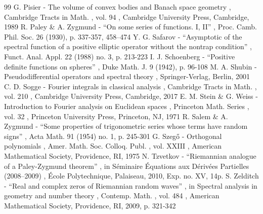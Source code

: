 \documentclass[11pt]{article}
\theoremstyle{theorem}
\theoremstyle{definition}
\begin{document}
\begin{thebibliography}{99}
 G. Pisier - The volume of convex bodies and Banach space geometry , Cambridge Tracts in Math. , vol. 94 , Cambridge University Press, Cambridge, 1989
 R. Paley \& A. Zygmund - “On some series of functions. I, II” , Proc. Camb. Phil. Soc. 26 (1930), p. 337-357, 458–474
 Y. G. Safarov - “Asymptotic of the spectral function of a positive elliptic operator without the nontrap condition” , Funct. Anal. Appl. 22 (1988) no. 3, p. 213-223
 I. J. Schoenberg - “Positive definite functions on spheres” , Duke Math. J. 9 (1942), p. 96-108
 M. A. Shubin - Pseudodifferential operators and spectral theory , Springer-Verlag, Berlin, 2001
 C. D. Sogge - Fourier integrals in classical analysis , Cambridge Tracts in Math. , vol. 210 , Cambridge University Press, Cambridge, 2017
 E. M. Stein \& G. Weiss - Introduction to Fourier analysis on Euclidean spaces , Princeton Math. Series , vol. 32 , Princeton University Press, Princeton, NJ, 1971
 R. Salem \& A. Zygmund - “Some properties of trigonometric series whose terms have random signs” , Acta Math. 91 (1954) no. 1, p. 245-301
 G. Szegő - Orthogonal polynomials , Amer. Math. Soc. Colloq. Publ. , vol. XXIII , American Mathematical Society, Providence, RI, 1975
 N. Tzvetkov - “Riemannian analogue of a Paley-Zygmund theorem” , in Séminaire Équations aux Dérivées Partielles (2008–2009) , École Polytechnique, Palaiseau, 2010, Exp. no. XV, 14p.
 S. Zelditch - “Real and complex zeros of Riemannian random waves” , in Spectral analysis in geometry and number theory , Contemp. Math. , vol. 484 , American Mathematical Society, Providence, RI, 2009, p. 321-342
\end{thebibliography}
\end{document}
